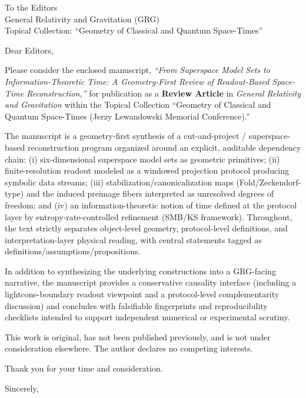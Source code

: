 \documentclass[11pt,a4paper]{letter}
\date{\today}
\begin{document}
\begin{letter}{To the Editors\\General Relativity and Gravitation (GRG)\\Topical Collection: ``Geometry of Classical and Quantum Space-Times''}

\opening{Dear Editors,}

Please consider the enclosed manuscript,
\emph{``From Superspace Model Sets to Information-Theoretic Time: A Geometry-First Review of Readout-Based Space-Time Reconstruction,''}
for publication as a \textbf{Review Article} in \emph{General Relativity and Gravitation} within the Topical Collection
``Geometry of Classical and Quantum Space-Times (Jerzy Lewandowski Memorial Conference).''

The manuscript is a geometry-first synthesis of a cut-and-project / superspace-based reconstruction program organized around an explicit, auditable dependency chain:
(i) six-dimensional superspace model sets as geometric primitives;
(ii) finite-resolution readout modeled as a windowed projection protocol producing symbolic data streams;
(iii) stabilization/canonicalization maps (Fold/Zeckendorf-type) and the induced preimage fibers interpreted as unresolved degrees of freedom;
and (iv) an information-theoretic notion of time defined at the protocol layer by entropy-rate-controlled refinement (SMB/KS framework).
Throughout, the text strictly separates object-level geometry, protocol-level definitions, and interpretation-layer physical reading, with central statements tagged as definitions/assumptions/propositions.

In addition to synthesizing the underlying constructions into a GRG-facing narrative, the manuscript provides a conservative causality interface (including a lightcone-boundary readout viewpoint and a protocol-level complementarity discussion) and concludes with falsifiable fingerprints and reproducibility checklists intended to support independent numerical or experimental scrutiny.

This work is original, has not been published previously, and is not under consideration elsewhere. The author declares no competing interests.

Thank you for your time and consideration.

\closing{Sincerely,}

\end{letter}
\end{document}
